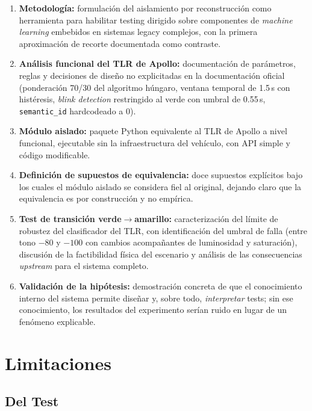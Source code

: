 \begin{enumerate}
    \item \textbf{Metodología:} formulación del aislamiento por reconstrucción como herramienta para habilitar testing dirigido sobre componentes de \textit{machine learning} embebidos en sistemas legacy complejos, con la primera aproximación de recorte documentada como contraste.

    \item \textbf{Análisis funcional del TLR de Apollo:} documentación de parámetros, reglas y decisiones de diseño no explicitadas en la documentación oficial (ponderación 70/30 del algoritmo húngaro, ventana temporal de 1.5\,s con histéresis, \textit{blink detection} restringido al verde con umbral de 0.55\,s, \texttt{semantic\_id} hardcodeado a 0).

    \item \textbf{Módulo aislado:} paquete Python equivalente al TLR de Apollo a nivel funcional, ejecutable sin la infraestructura del vehículo, con API simple y código modificable.

    \item \textbf{Definición de supuestos de equivalencia:} doce supuestos explícitos bajo los cuales el módulo aislado se considera fiel al original, dejando claro que la equivalencia es por construcción y no empírica.

    \item \textbf{Test de transición verde$\to$amarillo:} caracterización del límite de robustez del clasificador del TLR, con identificación del umbral de falla (entre tono $-80$ y $-100$ con cambios acompañantes de luminosidad y saturación), discusión de la factibilidad física del escenario y análisis de las consecuencias \textit{upstream} para el sistema completo.

    \item \textbf{Validación de la hipótesis:} demostración concreta de que el conocimiento interno del sistema permite diseñar y, sobre todo, \textit{interpretar} tests; sin ese conocimiento, los resultados del experimento serían ruido en lugar de un fenómeno explicable.
\end{enumerate}

\section{Limitaciones}

\subsection{Del Test}

